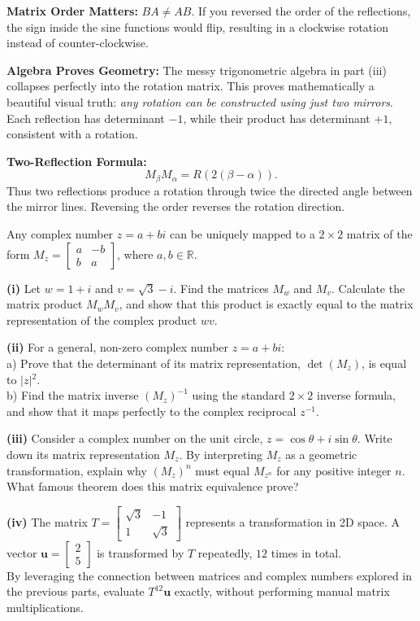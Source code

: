 \begin{takeaways}
\item \textbf{Matrix Order Matters:} $BA \neq AB$. If you reversed the order of the reflections, the sign inside the sine functions would flip, resulting in a clockwise rotation instead of counter-clockwise.
\item \textbf{Algebra Proves Geometry:} The messy trigonometric algebra in part (iii) collapses perfectly into the rotation matrix. This proves mathematically a beautiful visual truth: \textit{any rotation can be constructed using just two mirrors}. Each reflection has determinant $-1$, while their product has determinant $+1$, consistent with a rotation.
\item \textbf{Two-Reflection Formula:}
\[
M_\beta M_\alpha=R\!\left(2(\beta-\alpha)\right).
\]
Thus two reflections produce a rotation through twice the directed angle between the mirror lines. Reversing the order reverses the rotation direction.
\end{takeaways}

\begin{problem}
Any complex number $z = a + bi$ can be uniquely mapped to a $2 \times 2$ matrix of the form $M_z = \begin{bmatrix} a & -b \\ b & a \end{bmatrix}$, where $a, b \in \mathbb{R}$.

\textbf{(i)} Let $w = 1 + i$ and $v = \sqrt{3} - i$. Find the matrices $M_w$ and $M_v$. Calculate the matrix product $M_w M_v$, and show that this product is exactly equal to the matrix representation of the complex product $wv$. 

\textbf{(ii)} For a general, non-zero complex number $z = a + bi$: \\
a) Prove that the determinant of its matrix representation, $\det(M_z)$, is equal to $\vert{}z\vert{}^2$. \\
b) Find the matrix inverse $(M_z)^{-1}$ using the standard $2 \times 2$ inverse formula, and show that it maps perfectly to the complex reciprocal $z^{-1}$.

\textbf{(iii)} Consider a complex number on the unit circle, $z = \cos\theta + i\sin\theta$. Write down its matrix representation $M_z$. By interpreting $M_z$ as a geometric transformation, explain why $(M_z)^n$ must equal $M_{z^n}$ for any positive integer $n$. What famous theorem does this matrix equivalence prove?

\textbf{(iv)} The matrix $T = \begin{bmatrix} \sqrt{3} & -1 \\ 1 & \sqrt{3} \end{bmatrix}$ represents a transformation in 2D space. A vector $\mathbf{u} = \begin{bmatrix} 2 \\ 5 \end{bmatrix}$ is transformed by $T$ repeatedly, $12$ times in total. \\
By leveraging the connection between matrices and complex numbers explored in the previous parts, evaluate $T^{12}\mathbf{u}$ exactly, without performing manual matrix multiplications.
\end{problem}

